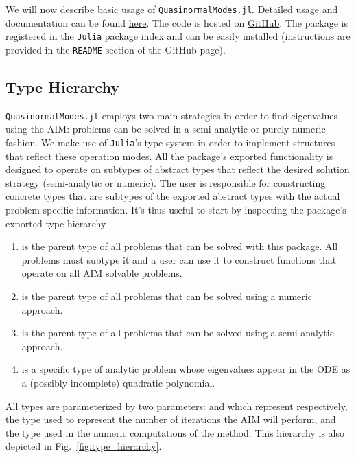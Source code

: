 We will now describe basic usage of \texttt{QuasinormalModes.jl}. Detailed usage and documentation can be found \href{https://lucass-carneiro.github.io/QuasinormalModes.jl/stable/}{here}. The code is hosted on \href{https://github.com/lucass-carneiro/QuasinormalModes.jl}{GitHub}. The package is registered in the \texttt{Julia} package index and can be easily installed (instructions are provided in the \texttt{README} section of the GitHub page).

\subsection{Type Hierarchy}

\texttt{QuasinormalModes.jl} employs two main strategies in order to find eigenvalues using the AIM: problems can be solved in a semi-analytic or purely numeric fashion. We make use of \texttt{Julia}'s type system in order to implement structures that reflect these operation modes. All the package's exported functionality is designed to operate on subtypes of abstract types that reflect the desired solution strategy (semi-analytic or numeric). The user is responsible for constructing concrete types that are subtypes of the exported abstract types with the actual problem specific information. It's thus useful to start by inspecting the package's exported type hierarchy
%
\begin{enumerate}
  \item {} is the parent type of all problems that can be solved with this package. All problems must subtype it and a user can use it to construct functions that operate on all AIM solvable problems.
  \item {} is the parent type of all problems that can be solved using a numeric approach.
  \item {} is the parent type of all problems that can be solved using a semi-analytic approach.
  \item {} is a specific type of analytic problem whose eigenvalues appear in the ODE as a (possibly incomplete) quadratic polynomial.
\end{enumerate}
%
All types are parameterized by two parameters:  and  which represent respectively, the type used to represent the number of iterations the AIM will perform, and the type used in the numeric computations of the method. This hierarchy is also depicted in Fig.~\ref{fig:type_hierarchy}.

